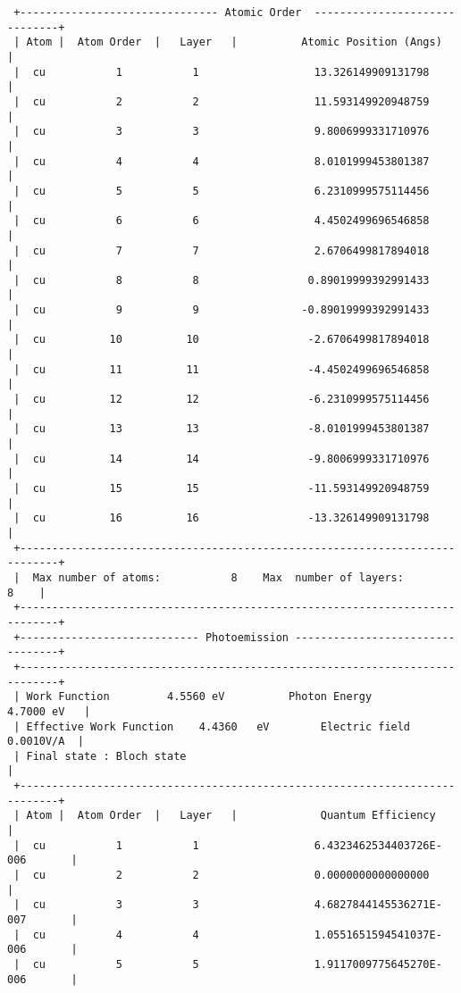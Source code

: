 \documentclass[a4paper,11pt,twoside]{book}
\begin{document}
\begin{enumerate}
\begin{verbatim}
 +------------------------------- Atomic Order  ------------------------------+
 | Atom |  Atom Order  |   Layer   |          Atomic Position (Angs)          |
 |  cu           1           1                  13.326149909131798            |
 |  cu           2           2                  11.593149920948759            |
 |  cu           3           3                  9.8006999331710976            |
 |  cu           4           4                  8.0101999453801387            |
 |  cu           5           5                  6.2310999575114456            |
 |  cu           6           6                  4.4502499696546858            |
 |  cu           7           7                  2.6706499817894018            |
 |  cu           8           8                 0.89019999392991433            |
 |  cu           9           9                -0.89019999392991433            |
 |  cu          10          10                 -2.6706499817894018            |
 |  cu          11          11                 -4.4502499696546858            |
 |  cu          12          12                 -6.2310999575114456            |
 |  cu          13          13                 -8.0101999453801387            |
 |  cu          14          14                 -9.8006999331710976            |
 |  cu          15          15                 -11.593149920948759            |
 |  cu          16          16                 -13.326149909131798            |
 +----------------------------------------------------------------------------+
 |  Max number of atoms:           8    Max  number of layers:           8    |
 +----------------------------------------------------------------------------+
 +---------------------------- Photoemission ---------------------------------+
 +----------------------------------------------------------------------------+
 | Work Function         4.5560 eV          Photon Energy         4.7000 eV   |
 | Effective Work Function    4.4360   eV        Electric field    0.0010V/A  |
 | Final state : Bloch state                                                  |
 +----------------------------------------------------------------------------+
 | Atom |  Atom Order  |   Layer   |             Quantum Efficiency           |
 |  cu           1           1                  6.4323462534403726E-006       |
 |  cu           2           2                  0.0000000000000000            |
 |  cu           3           3                  4.6827844145536271E-007       |
 |  cu           4           4                  1.0551651594541037E-006       |
 |  cu           5           5                  1.9117009775645270E-006       |

\end{verbatim}
\end{enumerate}
\end{document}
